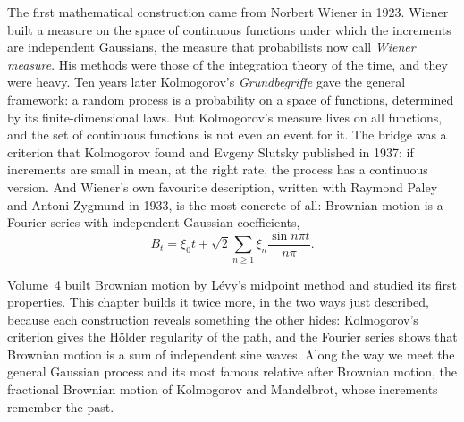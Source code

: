 The first mathematical construction came from Norbert Wiener in 1923. Wiener built a measure on the space of continuous functions under which the increments are
independent Gaussians, the measure that probabilists now call \emph{Wiener measure}. His methods were those of the integration theory of the time, and they were
heavy. Ten years later Kolmogorov's \emph{Grundbegriffe} gave the general framework: a random process is a probability on a space of functions, determined by its
finite-dimensional laws. But Kolmogorov's measure lives on all functions, and the set of continuous functions is not even an event for it. The bridge was a
criterion that Kolmogorov found and Evgeny Slutsky published in 1937: if increments are small in mean, at the right rate, the process has a continuous version.
And Wiener's own favourite description, written with Raymond Paley and Antoni Zygmund in 1933, is the most concrete of all: Brownian motion is a Fourier series
with independent Gaussian coefficients,
\[B_t=\xi_0t+\sqrt2\sum_{n\ge1}\xi_n\frac{\sin n\pi t}{n\pi}.\]

Volume~4 built Brownian motion by L\'evy's midpoint method and studied its first properties. This chapter builds it twice more, in the two ways just described,
because each construction reveals something the other hides: Kolmogorov's criterion gives the H\"older regularity of the path, and the Fourier series shows
that Brownian motion is a sum of independent sine waves. Along the way we meet the general Gaussian process and its most famous relative after Brownian motion,
the fractional Brownian motion of Kolmogorov and Mandelbrot, whose increments remember the past.

